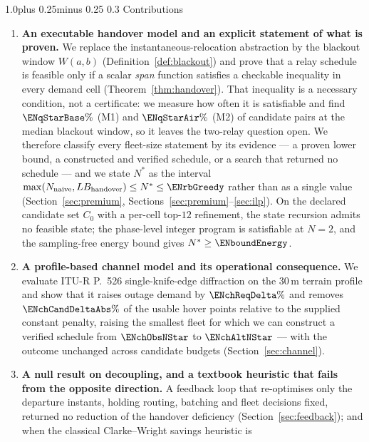 \documentclass[11pt]{article}
\makeatletter
\def\subsection{\@startsection{subsection}{2}{\z@}%
    {1.0\baselineskip plus 0.25\baselineskip minus 0.25\baselineskip}%
    {0.3\baselineskip}%
    {\normalfont\normalsize\itshape}}%
\theoremstyle{dshplain}
\theoremstyle{dshdefn}
\makeatother
\begin{document}
\subsection{Contributions}
\begin{enumerate}[leftmargin=1.8em,itemsep=2pt]
\item \textbf{An executable handover model and an explicit statement of what is
  proven.} We replace the instantaneous-relocation abstraction by the blackout
  window $W(a,b)$ (Definition~\ref{def:blackout}) and prove that a relay schedule
  is feasible only if a scalar \emph{span} function satisfies a checkable
  inequality in every demand cell (Theorem~\ref{thm:handover}). That inequality
  is a necessary condition, not a certificate: we measure how often it is
  satisfiable and find $\ENqStarBase\%$ (M1) and $\ENqStarAir\%$ (M2) of candidate
  pairs at the median blackout window, so it leaves the two-relay question open.
  We therefore classify every fleet-size statement by its evidence --- a proven
  lower bound, a constructed and verified schedule, or a search that returned no
  schedule --- and we state $N^{*}$ as the interval
  $\max(N_{\mathrm{naive}},LB_{\mathrm{handover}})\le N^{*}\le\ENrbGreedy$ rather
  than as a single value (Section~\ref{sec:premium},
  Sections~\ref{sec:premium}--\ref{sec:ilp}). On the declared candidate set
  $C_0$ with a per-cell top-$12$ refinement, the state recursion admits no
  feasible state; the phase-level integer program
  is satisfiable at $N=2$, and the sampling-free energy bound gives
  $N^{*}\ge\ENboundEnergy$.
\item \textbf{A profile-based channel model and its operational consequence.}
  We evaluate ITU-R P.~526 single-knife-edge diffraction on the $30$\,m terrain
  profile and show that it raises outage demand by $\ENchReqDelta\%$ and removes
  $\ENchCandDeltaAbs\%$ of the usable hover points relative to the supplied constant
  penalty, raising the smallest fleet for which we can construct a verified
  schedule from $\ENchObsNStar$ to $\ENchAltNStar$ --- with the outcome unchanged
  across candidate budgets (Section~\ref{sec:channel}).
\item \textbf{A null result on decoupling, and a textbook heuristic that fails
  from the opposite direction.} A feedback loop that re-optimises only the
  departure instants, holding routing, batching and fleet decisions fixed,
  returned no reduction of the handover deficiency (Section~\ref{sec:feedback});
  and when the classical Clarke--Wright savings heuristic \cite{clarke1964} is

\end{enumerate}
\end{document}
